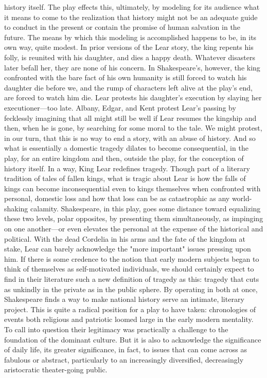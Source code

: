 history itself. The play effects this, ultimately, by modeling for its audience what it means to come to the realization that history might not be an adequate guide to conduct in the present or contain the promise of human salvation in the future. The means by which this modeling is accomplished happens to be, in its own way, quite modest. In prior versions of the Lear story, the king repents his folly, is reunited with his daughter, and dies a happy death. Whatever disasters later befall her, they are none of his concern. In Shakespeare's, however, the king confronted with the bare fact of his own humanity is still forced to watch his daughter die before we, and the rump of characters left alive at the play's end, are forced to watch him die. Lear protests his daughter's execution by slaying her executioner—too late. Albany, Edgar, and Kent protest Lear's passing by fecklessly imagining that all might still be well if Lear resumes the kingship and then, when he is gone, by searching for some moral to the tale. We might protest, in our turn, that this is no way to end a story, with an abuse of history. And so what is essentially a domestic tragedy dilates to become consequential, in the play, for an entire kingdom and then, outside the play, for the conception of history itself. In a way, King Lear redefines tragedy. Though part of a literary tradition of tales of fallen kings, what is tragic about Lear is how the falls of kings can become inconsequential even to kings themselves when confronted with personal, domestic loss and how that loss can be as catastrophic as any world-shaking calamity. Shakespeare, in this play, goes some distance toward equalizing these two levels, polar opposites, by presenting them simultaneously, as impinging on one another—or even elevates the personal at the expense of the historical and political. With the dead Cordelia in his arms and the fate of the kingdom at stake, Lear can barely acknowledge the "more important" issues pressing upon him. If there is some credence to the notion that early modern subjects began to think of themselves as self-motivated individuals, we should certainly expect to find in their literature such a new definition of tragedy as this: tragedy that cuts as unkindly in the private as in the public sphere. By operating in both at once, Shakespeare finds a way to make national history serve an intimate, literary project. This is quite a radical position for a play to have taken: chronologies of events both religious and patriotic loomed large in the early modern mentality. To call into question their legitimacy was practically a challenge to the foundation of the dominant culture. But it is also to acknowledge the significance of daily life, its greater significance, in fact, to issues that can come across as fabulous or abstract, particularly to an increasingly diversified, decreasingly aristocratic theater-going public.

